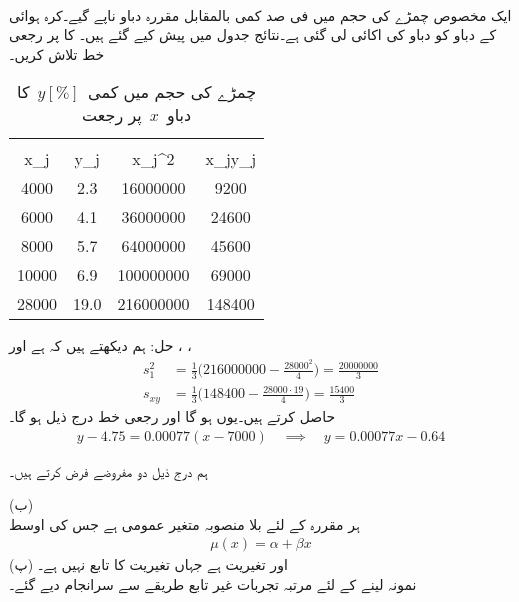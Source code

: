 \quad {}\\
ایک مخصوص چمڑے کی حجم میں فی صد کمی  بالمقابل مقررہ دباو  ناپے  گیے۔کرہ ہوائی کے دباو کو دباو کی اکائی لی گئی ہے۔نتائج جدول  میں پیش کیے گئے ہیں۔ کا  پر رجعی خط تلاش کریں۔
\begin{table}
\caption{چمڑے کی حجم میں کمی $\,y [\si{\percent}]\,$ کا دباو $\,x\,$ پر رجعت}
\label{جدول_شماریات_چمڑا_رجعت}
\centering
\begin{otherlanguage}{english}
\begin{tabular}{CC||CC}
 &\\
x_j&y_j&x_j^2&x_jy_j\\
\hline
\num{4000}&2.3&\num{16000000}&\num{9200}\\
\num{6000}&4.1&\num{36000000}&\num{24600}\\
\num{8000}&5.7&\num{64000000}&\num{45600}\\
\num{10000}&6.9&\num{100000000}&\num{69000}\\
\hline
\num{28000}&19.0&\num{216000000}&\num{148400}\\
\hline
\end{tabular}
\end{otherlanguage}
\end{table}

حل:\quad
ہم دیکھتے ہیں کہ  ہے اور ، ،
\begin{align*}
s_1^2&=\frac{1}{3}\big(\num{216000000}-\frac{\num{28000}^2}{4}\big)=\frac{\num{20000000}}{3}\\
s_{xy}&=\frac{1}{3}\big(\num{148400}-\frac{\num{28000}\cdot 19}{4}\big)=\frac{\num{15400}}{3}
\end{align*}
حاصل کرتے ہیں۔یوں  ہو گا  اور رجعی خط درج ذیل ہو گا۔
\begin{align*}
y-4.75=\num{0.00077}(x-7000) \quad \implies \quad y=\num{0.00077}x-0.64
\end{align*}

ہم درج ذیل دو مفروضے فرض کرتے ہیں۔

 (ب)\\
ہر مقررہ  کے لئے بلا منصوبہ متغیر  عمومی ہے جس کی اوسط
\begin{align}\label{مساوات_شماریات_سیدھا_خط_بٹھانا_د}
\mu(x)=\alpha+\beta x
\end{align}
اور تغیریت  ہے جہاں تغیریت  کا تابع نہیں ہے۔
 (پ)\\
نمونہ  لینے کے لئے  مرتبہ تجربات غیر تابع طریقے سے سرانجام دیے گئے۔


